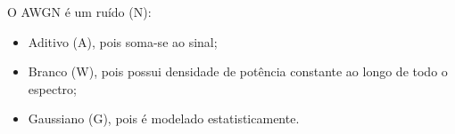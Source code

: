O AWGN é um ruído (N):
\begin{itemize}
    \item Aditivo (A), pois soma-se ao sinal;
    \item Branco (W), pois possui densidade de potência constante ao longo de todo o espectro;
    \item Gaussiano (G), pois é modelado estatisticamente.
\end{itemize}